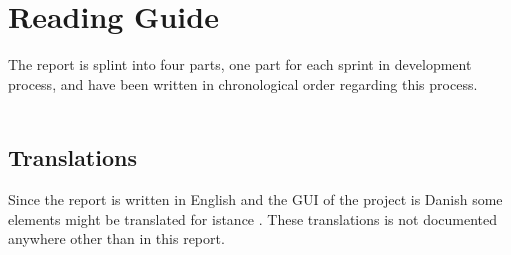 
\section*{Reading Guide}

The report is splint into four parts, one part for each sprint in development process, and have been written in chronological order regarding this process. 
\\\\
\subsection*{Translations}
\label{sub:translations}
Since the report is written in English and the GUI of the project is Danish some elements might be translated for istance 
. These translations is not documented anywhere other than in this report.

